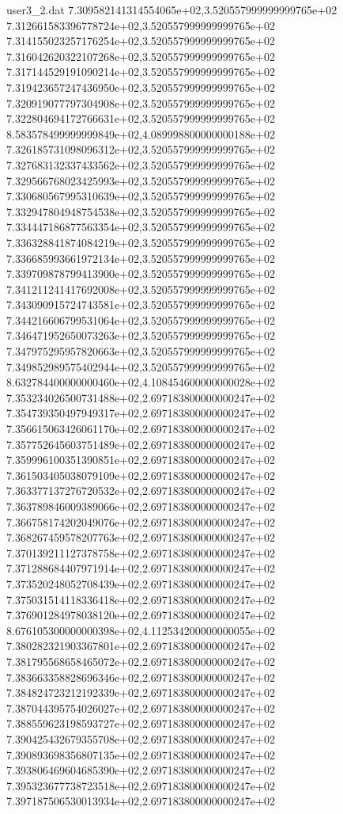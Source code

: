 \begin{filecontents}{user3_2.dat}
7.309582141314554065e+02,3.520557999999999765e+02
7.312661583396778724e+02,3.520557999999999765e+02
7.314155023257176254e+02,3.520557999999999765e+02
7.316042620322107268e+02,3.520557999999999765e+02
7.317144529191090214e+02,3.520557999999999765e+02
7.319423657247436950e+02,3.520557999999999765e+02
7.320919077797304908e+02,3.520557999999999765e+02
7.322804694172766631e+02,3.520557999999999765e+02
8.583578499999999849e+02,4.089998800000000188e+02
7.326185731098096312e+02,3.520557999999999765e+02
7.327683132337433562e+02,3.520557999999999765e+02
7.329566768023425993e+02,3.520557999999999765e+02
7.330680567995310639e+02,3.520557999999999765e+02
7.332947804948754538e+02,3.520557999999999765e+02
7.334447186877563354e+02,3.520557999999999765e+02
7.336328841874084219e+02,3.520557999999999765e+02
7.336685993661972134e+02,3.520557999999999765e+02
7.339709878799413900e+02,3.520557999999999765e+02
7.341211241417692008e+02,3.520557999999999765e+02
7.343090915724743581e+02,3.520557999999999765e+02
7.344216606799531064e+02,3.520557999999999765e+02
7.346471952650073263e+02,3.520557999999999765e+02
7.347975295957820663e+02,3.520557999999999765e+02
7.349852989575402944e+02,3.520557999999999765e+02
8.632784400000000460e+02,4.108454600000000028e+02
7.353234026500731488e+02,2.697183800000000247e+02
7.354739350497949317e+02,2.697183800000000247e+02
7.356615063426061170e+02,2.697183800000000247e+02
7.357752645603751489e+02,2.697183800000000247e+02
7.359996100351390851e+02,2.697183800000000247e+02
7.361503405038079109e+02,2.697183800000000247e+02
7.363377137276720532e+02,2.697183800000000247e+02
7.363789846009389066e+02,2.697183800000000247e+02
7.366758174202049076e+02,2.697183800000000247e+02
7.368267459578207763e+02,2.697183800000000247e+02
7.370139211127378758e+02,2.697183800000000247e+02
7.371288684407971914e+02,2.697183800000000247e+02
7.373520248052708439e+02,2.697183800000000247e+02
7.375031514118336418e+02,2.697183800000000247e+02
7.376901284978038120e+02,2.697183800000000247e+02
8.676105300000000398e+02,4.112534200000000055e+02
7.380282321903367801e+02,2.697183800000000247e+02
7.381795568658465072e+02,2.697183800000000247e+02
7.383663358828696346e+02,2.697183800000000247e+02
7.384824723212192339e+02,2.697183800000000247e+02
7.387044395754026027e+02,2.697183800000000247e+02
7.388559623198593727e+02,2.697183800000000247e+02
7.390425432679355708e+02,2.697183800000000247e+02
7.390893698356807135e+02,2.697183800000000247e+02
7.393806469604685390e+02,2.697183800000000247e+02
7.395323677738723518e+02,2.697183800000000247e+02
7.397187506530013934e+02,2.697183800000000247e+02

\end{filecontents}
